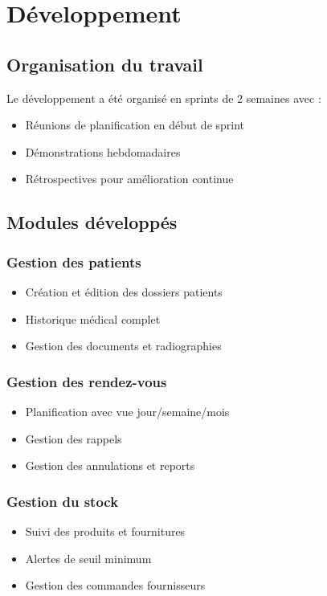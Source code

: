 \documentclass[12pt,a4paper]{report}
\begin{document}
\chapter{Développement}
\section{Organisation du travail}
Le développement a été organisé en sprints de 2 semaines avec :
\begin{itemize}
    \item Réunions de planification en début de sprint
    \item Démonstrations hebdomadaires
    \item Rétrospectives pour amélioration continue
\end{itemize}

\section{Modules développés}
\subsection{Gestion des patients}
\begin{itemize}
    \item Création et édition des dossiers patients
    \item Historique médical complet
    \item Gestion des documents et radiographies
\end{itemize}

\subsection{Gestion des rendez-vous}
\begin{itemize}
    \item Planification avec vue jour/semaine/mois
    \item Gestion des rappels
    \item Gestion des annulations et reports
\end{itemize}

\subsection{Gestion du stock}
\begin{itemize}
    \item Suivi des produits et fournitures
    \item Alertes de seuil minimum
    \item Gestion des commandes fournisseurs
\end{itemize}
\end{document}

